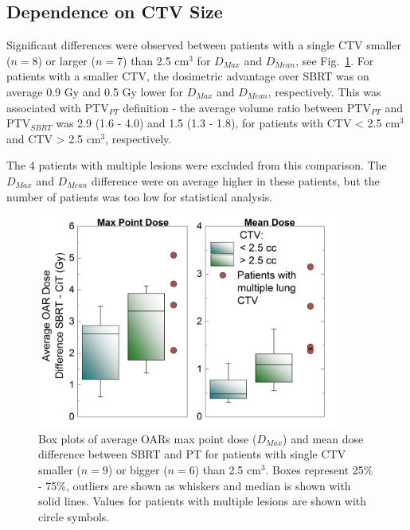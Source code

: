 \subsection{Dependence on CTV Size}

Significant differences were observed between patients with a single CTV smaller ($n=8$) or larger ($n=7$) than 2.5 cm$^{3}$ for $D_{Max}$ and $D_{Mean}$, see Fig.~\ref{Fig:OAR_boxplots}. For patients with a smaller CTV, the dosimetric advantage over SBRT was on average 0.9 Gy and 0.5 Gy lower for $D_{Max}$ and $D_{Mean}$, respectively. This was associated with PTV$_{PT}$ definition - the average volume ratio between PTV$_{PT}$ and PTV$_{SBRT}$ was 2.9 (1.6 - 4.0) and 1.5 (1.3 - 1.8), for patients with CTV < 2.5 cm$^{3}$ and CTV > 2.5 cm$^{3}$, respectively.

The 4 patients with multiple lesions were excluded from this comparison. The $D_{Max}$ and $D_{Mean}$ difference were on average higher in these patients, but the number of patients was too low for statistical analysis. 


\begin{figure}[H]
\begin{center}
\includegraphics[width=0.9\textwidth]{./PatientStudy/Images/Figure4.png}
\caption{Box plots of average OARs max point dose ($D_{Max}$) and mean dose difference between SBRT and PT for patients with single CTV smaller ($n = 9$) or bigger ($n = 6$) than 2.5 cm$^{3}$. Boxes represent 25\% - 75\%, outliers are shown as whiskers and median is shown with solid lines. Values for patients with multiple lesions are shown with circle symbols.}
\label{Fig:OAR_boxplots}
\end{center}
\end{figure}


